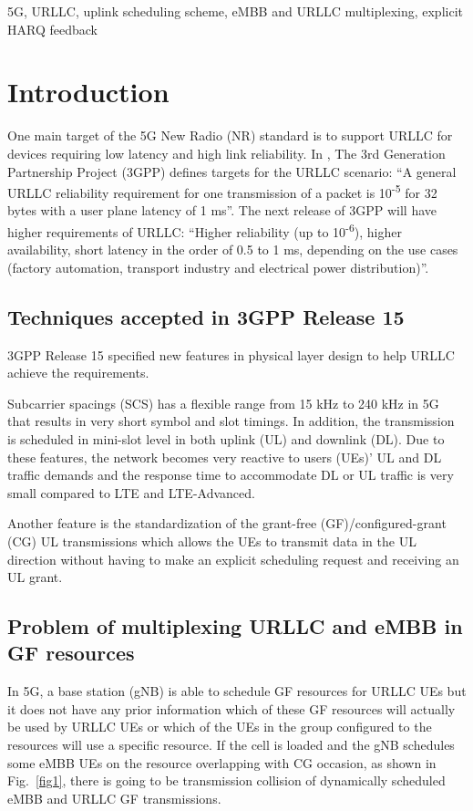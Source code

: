 \documentclass[conference]{IEEEtran}
\begin{document}
\begin{IEEEkeywords}
5G, URLLC, uplink scheduling scheme, eMBB and URLLC multiplexing, explicit HARQ feedback
\end{IEEEkeywords}

\section{Introduction} \label{I}
One main target of the 5G New Radio (NR) standard is to support URLLC for devices requiring low latency and high link reliability. In \cite{b6}, The 3rd Generation Partnership Project (3GPP) defines targets for the URLLC scenario: ``A general URLLC reliability requirement for one transmission of a packet is 10\textsuperscript{-5} for 32 bytes with a user plane latency of 1 ms''. The next release of 3GPP will have higher requirements of URLLC: ``Higher reliability (up to 10\textsuperscript{-6}), higher availability, short latency in the order of 0.5 to 1 ms, depending on the use cases (factory automation, transport industry and electrical power distribution)''\cite{b8}.

\subsection{Techniques accepted in 3GPP Release 15}\label{IAA}
3GPP Release 15 specified new features in physical layer design to help URLLC achieve the requirements.

Subcarrier spacings (SCS) has a flexible range from 15 kHz to 240 kHz in 5G that results in very short symbol and slot timings\cite{ad2}. In addition, the transmission is scheduled in  mini-slot level in both uplink (UL) and downlink (DL)\cite{ad3}. Due to these features, the network becomes very reactive to users (UEs)' UL and DL traffic demands and the response time to accommodate DL or UL traffic is very small compared to LTE and LTE-Advanced.

Another feature is the standardization of the grant-free (GF)/configured-grant (CG) UL transmissions which allows the UEs to transmit data in the UL direction without having to make an explicit scheduling request and receiving an UL grant\cite{ad4}.

\subsection{Problem of multiplexing URLLC and eMBB in GF resources}\label{IBB}
In 5G, a base station (gNB) is able to schedule GF resources for URLLC UEs but it does not have any prior information which of these GF resources will actually be used by URLLC UEs or which of the UEs in the group configured to the resources will use a specific resource. If the cell is loaded and the gNB schedules some eMBB UEs on the resource overlapping with CG occasion, as shown in Fig.~\ref{fig1}, there is going to be transmission collision of dynamically scheduled eMBB and URLLC GF transmissions. 
\end{document}
